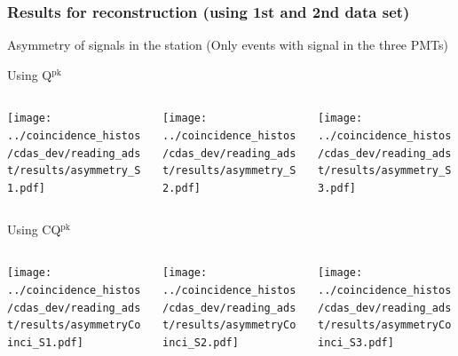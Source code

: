 \documentclass[aspectratio=169]{beamer}
\begin{document}
\begin{frame}
  \frametitle{Results for reconstruction (using 1st and 2nd data
  set)}
  Asymmetry of signals in the station
  (Only events with signal in the three PMTs)
  \vspace{0.3cm}

  Using Q$^{\mathrm{pk}}$ 
  \begin{columns}
    \centering
    \begin{column}{0.33\textwidth}
      \texttt{[image: ../coincidence\_histos/cdas\_dev/reading\_adst/results/asymmetry\_S1.pdf]}
    \end{column}
    \begin{column}{0.33\textwidth}
      \texttt{[image: ../coincidence\_histos/cdas\_dev/reading\_adst/results/asymmetry\_S2.pdf]}
    \end{column}
    \begin{column}{0.33\textwidth}
      \texttt{[image: ../coincidence\_histos/cdas\_dev/reading\_adst/results/asymmetry\_S3.pdf]}
    \end{column}
  \end{columns}
  \vspace{0.2cm}
 
  Using CQ$^{\mathrm{pk}}$ 
  \begin{columns}
    \centering
    \begin{column}{0.33\textwidth}
      \texttt{[image: ../coincidence\_histos/cdas\_dev/reading\_adst/results/asymmetryCoinci\_S1.pdf]}
    \end{column}
    \begin{column}{0.33\textwidth}
      \texttt{[image: ../coincidence\_histos/cdas\_dev/reading\_adst/results/asymmetryCoinci\_S2.pdf]}
    \end{column}
    \begin{column}{0.33\textwidth}
      \texttt{[image: ../coincidence\_histos/cdas\_dev/reading\_adst/results/asymmetryCoinci\_S3.pdf]}
    \end{column}
  \end{columns}
\end{frame}
\end{document}
